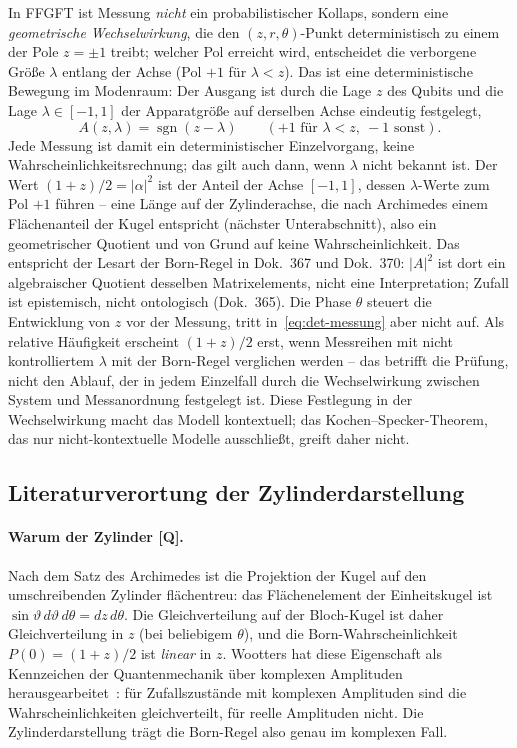 In FFGFT ist Messung \emph{nicht} ein probabilistischer Kollaps,
sondern eine \emph{geometrische Wechselwirkung}, die den
$(z, r, \theta)$-Punkt deterministisch zu einem der Pole
$z = \pm 1$ treibt; welcher Pol erreicht wird, entscheidet die
verborgene Größe $\lambda$ entlang der Achse (Pol $+1$ für
$\lambda < z$). Das ist eine deterministische Bewegung im
Modenraum: Der Ausgang ist durch die Lage $z$ des
Qubits und die Lage $\lambda \in [-1,1]$ der Apparatgröße auf
derselben Achse eindeutig festgelegt,
\begin{equation}
  A(z,\lambda) = \operatorname{sgn}(z - \lambda)
  \qquad (+1 \text{ für } \lambda < z,\ -1 \text{ sonst}).
  \label{eq:det-messung}
\end{equation}
Jede Messung ist damit ein deterministischer Einzelvorgang, keine
Wahrscheinlichkeitsrechnung; das gilt auch dann, wenn $\lambda$ nicht
bekannt ist. Der Wert $(1+z)/2 = |\alpha|^2$ ist der Anteil der Achse
$[-1,1]$, dessen $\lambda$-Werte zum Pol $+1$ führen -- eine Länge auf
der Zylinderachse, die nach Archimedes einem Flächenanteil der Kugel
entspricht (nächster Unterabschnitt), also ein geometrischer Quotient
und von Grund auf keine Wahrscheinlichkeit. Das entspricht der
Lesart der Born-Regel in Dok.~367 und Dok.~370: $|A|^2$ ist dort ein
algebraischer Quotient desselben Matrixelements, nicht eine
Interpretation; Zufall ist epistemisch, nicht ontologisch
(Dok.~365). Die Phase $\theta$ steuert die Entwicklung von $z$ vor der
Messung, tritt in~\eqref{eq:det-messung} aber nicht auf. Als relative
Häufigkeit erscheint $(1+z)/2$ erst, wenn Messreihen mit nicht
kontrolliertem $\lambda$ mit der Born-Regel verglichen werden -- das
betrifft die Prüfung, nicht den Ablauf, der in jedem Einzelfall durch
die Wechselwirkung zwischen System und Messanordnung festgelegt ist. Diese Festlegung in der
Wechselwirkung macht das Modell kontextuell; das
Kochen--Specker-Theorem, das nur nicht-kontextuelle Modelle
ausschließt, greift daher nicht.

\subsection{Literaturverortung der Zylinderdarstellung}

\paragraph{Warum der Zylinder [Q].} Nach dem Satz des Archimedes ist
die Projektion der Kugel auf den umschreibenden Zylinder
flächentreu: das Flächenelement der Einheitskugel ist
$\sin\vartheta\,d\vartheta\,d\theta = dz\,d\theta$. Die
Gleichverteilung auf der Bloch-Kugel ist daher Gleichverteilung in
$z$ (bei beliebigem $\theta$), und die Born-Wahrscheinlichkeit
$P(0) = (1+z)/2$ ist \emph{linear} in $z$. Wootters hat diese
Eigenschaft als Kennzeichen der Quantenmechanik über komplexen
Amplituden herausgearbeitet~\cite{wootters1990}: für Zufallszustände
mit komplexen Amplituden sind die Wahrscheinlichkeiten gleichverteilt,
für reelle Amplituden nicht. Die Zylinderdarstellung trägt die
Born-Regel also genau im komplexen Fall.

